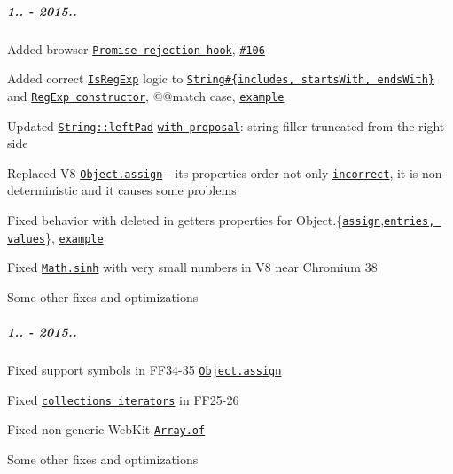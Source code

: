 \subparagraph*{1.. -\/ 2015..}


\begin{DoxyItemize}
\item Added browser \href{#unhandled-rejection-tracking}{\tt {\ttfamily Promise} rejection hook}, \href{https://github.com/zloirock/core-js/issues/106}{\tt \#106}
\item Added correct \href{http://www.ecma-international.org/ecma-262/6.0/#sec-isregexp}{\tt {\ttfamily Is\+Reg\+Exp}} logic to \href{https://github.com/zloirock/core-js/#ecmascript-6-string}{\tt {\ttfamily String\#\{includes, starts\+With, ends\+With\}}} and \href{https://github.com/zloirock/core-js/#ecmascript-6-regexp}{\tt {\ttfamily Reg\+Exp} constructor}, {\ttfamily @@match} case, \href{https://developer.mozilla.org/en-US/docs/Web/JavaScript/Reference/Global_Objects/Symbol/match#Disabling_the_isRegExp_check}{\tt example}
\item Updated \href{https://github.com/zloirock/core-js/#ecmascript-7-proposals}{\tt {\ttfamily String\+::left\+Pad}} \href{https://github.com/ljharb/proposal-string-pad-left-right/issues/6}{\tt with proposal}\+: string filler truncated from the right side
\item Replaced V8 \href{https://github.com/zloirock/core-js/#ecmascript-6-object}{\tt {\ttfamily Object.\+assign}} -\/ its properties order not only \href{https://github.com/sindresorhus/object-assign/issues/22}{\tt incorrect}, it is non-\/deterministic and it causes some problems
\item Fixed behavior with deleted in getters properties for {\ttfamily Object.\{}\href{https://github.com/zloirock/core-js/#ecmascript-6-object}{\tt {\ttfamily assign}}{\ttfamily ,}\href{https://github.com/zloirock/core-js/#ecmascript-7-proposals}{\tt {\ttfamily entries, values}}{\ttfamily \}}, \href{http://goo.gl/iQE01c}{\tt example}
\item Fixed \href{https://github.com/zloirock/core-js/#ecmascript-6-math}{\tt {\ttfamily Math.\+sinh}} with very small numbers in V8 near Chromium 38
\item Some other fixes and optimizations
\end{DoxyItemize}

\subparagraph*{1.. -\/ 2015..}


\begin{DoxyItemize}
\item Fixed support symbols in F\+F34-\/35 \href{https://github.com/zloirock/core-js/#ecmascript-6-object}{\tt {\ttfamily Object.\+assign}}
\item Fixed \href{https://github.com/zloirock/core-js/#ecmascript-6-iterators}{\tt collections iterators} in F\+F25-\/26
\item Fixed non-\/generic Web\+Kit \href{https://github.com/zloirock/core-js/#ecmascript-6-array}{\tt {\ttfamily Array.\+of}}
\item Some other fixes and optimizations
\end{DoxyItemize}

